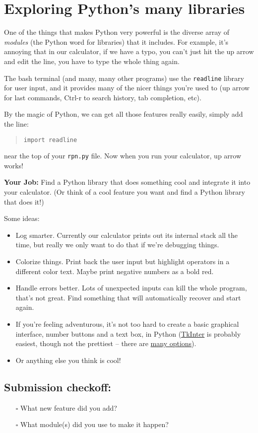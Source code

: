 \documentclass{article}
\begin{document}
\section{Exploring Python's many libraries}

One of the things that makes Python very powerful is the diverse array of
\emph{modules} (the Python word for libraries) that it includes. For example,
it's annoying that in our calculator, if we have a typo, you can't just hit
the up arrow and edit the line, you have to type the whole thing again.

The bash terminal (and many, many other programs) use the \texttt{readline}
library for user input, and it provides many of the nicer things you're used
to (up arrow for last commands, Ctrl-r to search history, tab completion, etc).

By the magic of Python, we can get all those features really easily, simply
add the line:
\begin{quote}
  \texttt{import readline}
\end{quote}
near the top of your \texttt{rpn.py} file. Now when you run your calculator,
up arrow works!

\textbf{Your Job:} Find a Python library that does something cool and
integrate it into your calculator. (Or think of a cool feature you want and
find a Python library that does it!)

Some ideas:
\begin{itemize}
  \item Log smarter. Currently our calculator prints out its internal stack
    all the time, but really we only want to do that if we're debugging
    things.
  \item Colorize things. Print back the user input but highlight operators in
    a different color text. Maybe print negative numbers as a bold red.
  \item Handle errors better. Lots of unexpected inputs can kill the whole
    program, that's not great. Find something that will automatically recover
    and start again.
  \item If you're feeling adventurous, it's not too hard to create a basic
    graphical interface, number buttons and a text box, in Python
    (\href{https://wiki.python.org/moin/TkInter}{TkInter} is probably easiest,
    though not the prettiest -- there are
    \href{https://wiki.python.org/moin/GuiProgramming}{many options}).
  \item Or anything else you think is cool!
\end{itemize}

\subsection*{Submission checkoff:}
\begin{itemize}
  \item[$\square$] What new feature did you add?
  \item[$\square$] What module(s) did you use to make it happen?
\end{itemize}
\end{document}
